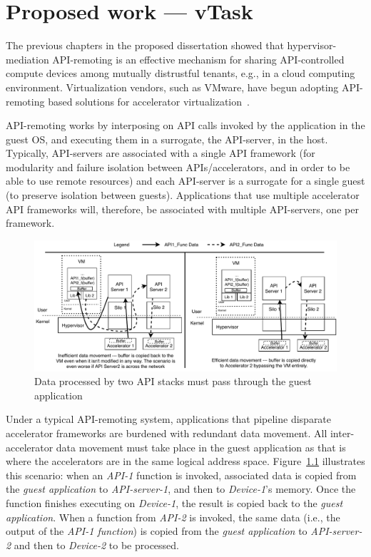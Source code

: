 \chapter{Proposed work --- vTask}
\label{sec:vTask}

The previous chapters in the proposed dissertation showed that
hypervisor-mediation API-remoting is an effective mechanism for sharing
API-controlled compute devices among mutually distrustful tenants, e.g., in a
cloud computing environment. Virtualization vendors, such as VMware, have
begun adopting API-remoting based solutions for accelerator virtualization~\cite{bitfusion-acquisition}.

API-remoting works by interposing on API calls invoked by the application in
the guest OS, and executing them in a surrogate, the API-server, in the host.
Typically, API-servers are associated with a single API framework (for
modularity and failure isolation between APIs/accelerators, and in order to be
able to use remote resources) and each API-server is a surrogate for a single
guest (to preserve isolation between guests). Applications that use multiple
accelerator API frameworks will, therefore, be associated with multiple
API-servers, one per framework.

\begin{figure}[ht!]
\centering
\captionsetup{justification=centering,width=\linewidth}
\includegraphics[width=\linewidth]{figures/vtask-overview.pdf}
\caption{Data processed by two API stacks must pass through the guest application}
\label{fig:overview}
\end{figure}

Under a typical API-remoting system, applications that pipeline disparate
accelerator frameworks are burdened with redundant data movement. All
inter-accelerator data movement must take place in the guest application as
that is where the accelerators are in the same logical address space.
Figure~\ref{fig:overview} illustrates this scenario: when an \emph{API-1}
function is invoked, associated data is copied from the
\emph{guest application} to \emph{API-server-1}, and then to \emph{Device-1}’s
memory. Once the function finishes executing on \emph{Device-1}, the result is
copied back to the \emph{guest application}. When a function from \emph{API-2}
is invoked, the same data (i.e., the output of the \emph{API-1 function}) is
copied from the \emph{guest application} to \emph{API-server-2} and then to
\emph{Device-2} to be processed.

